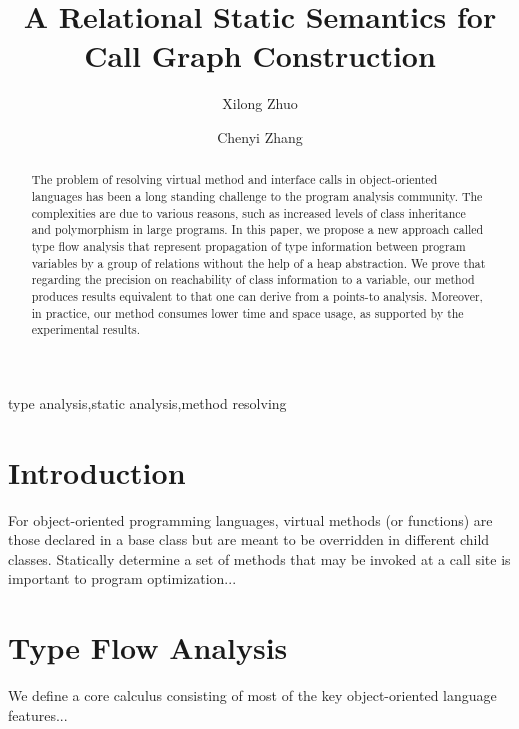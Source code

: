 \documentclass[review]{elsarticle}
\newcommand{\tflow}{\dashrightarrow}
\begin{document}
\begin{frontmatter}

\title{A Relational Static Semantics for\\ Call Graph Construction}

\author{Xilong Zhuo}


\author{Chenyi Zhang}

\begin{abstract}
The problem of resolving virtual method and interface calls in object-oriented languages has been a long standing challenge to the program analysis community. The complexities are due to various reasons, such as increased levels of class inheritance and polymorphism in large programs. In this paper, we propose a new approach called type flow analysis that represent propagation of type information between program variables by a group of relations without the help of a heap abstraction. We prove that regarding the precision on reachability of class information to a variable, our method produces results equivalent to that one can derive from a points-to analysis. Moreover, in practice, our method consumes lower time and space usage, as supported by the experimental results.
\end{abstract}

\begin{keyword}
type analysis\sep static analysis\sep method resolving
\end{keyword}

\end{frontmatter}

\linenumbers

\section{Introduction}\label{sec:introduction}

For object-oriented programming languages, virtual methods (or functions) are those declared in a base class but are meant to be overridden in different child classes. Statically determine a set of methods that may be invoked at a call site is important to program optimization...

\section{Type Flow Analysis}\label{sec:type-flow-analysis}
We define a core calculus consisting of most of the key object-oriented language features...
\end{document}
